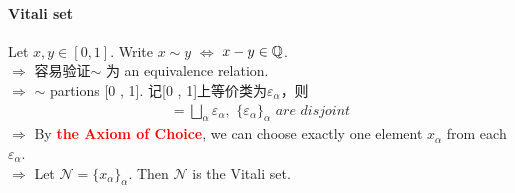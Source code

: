 \paragraph{Vitali set}
	Let $x , y \in [0 , 1]$. Write $x \sim y$ $\Leftrightarrow$ $x - y \in \mathbb{Q}$.\\
	$\Rightarrow$ 容易验证$\sim$ 为 an equivalence relation.\\
	$\Rightarrow$ $\sim$ partions [0 , 1]. 记[0 , 1]上等价类为$\varepsilon_{\alpha}$，则
	\begin{align}
		[0 , 1] = \bigsqcup_{\alpha}{\varepsilon_{\alpha}} , \,\, \{ \varepsilon_{\alpha} \}_{\alpha} \,\, are \,\, disjoint
	\end{align}
	$\Rightarrow$ By \textcolor{red}{\textbf{the Axiom of Choice}}, we can choose exactly one element $x_{\alpha}$ from each $\varepsilon_{\alpha}$.\\
	$\Rightarrow$ Let $\mathcal{N} = \{ x_{\alpha} \}_{\alpha}$. Then $\mathcal{N}$ is the Vitali set.
	
